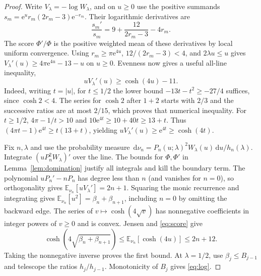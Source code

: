 \documentclass[11pt]{article}
\numberwithin{equation}{section}
\newcommand{\ee}{\mathrm e}
\newcommand{\dd}{\,\mathrm d}
\begin{document}
\begin{proof}
Write \(V_\lambda=-\log W_\lambda\), and on \(u\ge0\) use the
positive summands \(s_m=\ee^u r_m(2r_m-3)\ee^{-r_m}\).
Their logarithmic derivatives are
\[
 \frac{s_m'}{s_m}=9+\frac{12}{2r_m-3}-4r_m.
\]
The score \(\Phi'/\Phi\) is the positive weighted mean of these
derivatives by local uniform convergence. Using \(r_m\ge\pi
\ee^{4u}\), \(12/(2r_m-3)<4\), and \(2\lambda u\le u\) gives
\(V_\lambda'(u)\ge4\pi\ee^{4u}-13-u\) on \(u\ge0\).
Evenness now gives a useful all-line inequality,
\begin{equation}\label{eq:score}
 uV_\lambda'(u)\ge\cosh(4u)-11.
\end{equation}
Indeed, writing \(t=|u|\), for \(t\le1/2\) the lower bound
\(-13t-t^2\ge-27/4\) suffices, since \(\cosh 2<4\).
The series for \(\cosh 2\) after \(1+2\) starts with \(2/3\)
and the successive ratios are at most \(2/15\), which proves
that numerical inequality. For \(t\ge1/2\),
\(4\pi-1/t>10\) and \(10\ee^{4t}\ge10+40t\ge13+t\).
Thus \((4\pi t-1)\ee^{4t}\ge t(13+t)\), yielding
\(uV_\lambda'(u)\ge\ee^{4t}\ge\cosh(4t)\).

Fix \(n,\lambda\) and use the probability measure
\(\dd\nu_n=P_n(u;\lambda)^2W_\lambda(u)\dd u/h_n(\lambda)\).
Integrate \((uP_n^2 W_\lambda)'\) over the line. The bounds for
\(\Phi,\Phi'\) in Lemma~\ref{lem:domination} justify all integrals
and kill the boundary term. The polynomial \(uP_n'-nP_n\)
has degree less than \(n\) (and vanishes for \(n=0\)), so
orthogonality gives \(\mathbb E_{\nu_n}[uV_\lambda']=2n+1\).
Squaring the monic recurrence and integrating gives
\(\mathbb E_{\nu_n}[u^2]=\beta_n+\beta_{n+1}\), including
\(n=0\) by omitting the backward edge. The series of
\(v\mapsto\cosh(4\sqrt v)\) has nonnegative coefficients in
integer powers of \(v\ge0\) and is convex. Jensen and
\eqref{eq:score} give
\[
 \cosh(4\sqrt{\beta_n+\beta_{n+1}})
      \le\mathbb E_{\nu_n}[\cosh(4u)]\le 2n+12 .
\]
Taking the nonnegative inverse proves the first bound. At
\(\lambda=1/2\), use \(\beta_j\le B_{j-1}\) and telescope the
ratios \(h_j/h_{j-1}\). Monotonicity of \(B_j\) gives
\eqref{eq:log}.
\end{proof}
\end{document}

